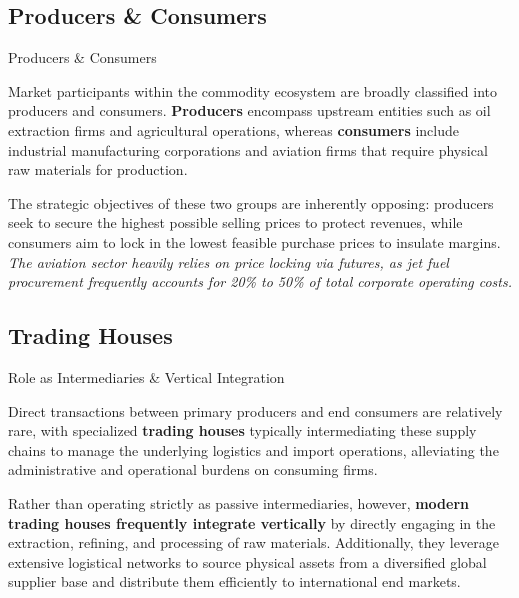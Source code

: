\documentclass[10pt]{article}
\begin{document}
  \subsection{Producers \& Consumers}
    
    \begin{core}{Producers \& Consumers}

      Market participants within the commodity ecosystem are broadly classified into producers and consumers. \textbf{Producers} encompass upstream entities such as oil extraction firms and agricultural operations, whereas \textbf{consumers} include industrial manufacturing corporations and aviation firms that require physical raw materials for production.

      The strategic objectives of these two groups are inherently opposing: producers seek to secure the highest possible selling prices to protect revenues, while consumers aim to lock in the lowest feasible purchase prices to insulate margins. \textit{The aviation sector heavily relies on price locking via futures, as jet fuel procurement frequently accounts for 20\% to 50\% of total corporate operating costs.}

    \end{core}

  \subsection{Trading Houses}
    \label{sec:trading_houses}

    \begin{core}{Role as Intermediaries \& Vertical Integration}

      Direct transactions between primary producers and end consumers are relatively rare, with specialized \textbf{trading houses} typically intermediating these supply chains to manage the underlying logistics and import operations, alleviating the administrative and operational burdens on consuming firms.

      Rather than operating strictly as passive intermediaries, however, \textbf{modern trading houses frequently integrate vertically} by directly engaging in the extraction, refining, and processing of raw materials. Additionally, they leverage extensive logistical networks to source physical assets from a diversified global supplier base and distribute them efficiently to international end markets.

    \end{core}
\end{document}

